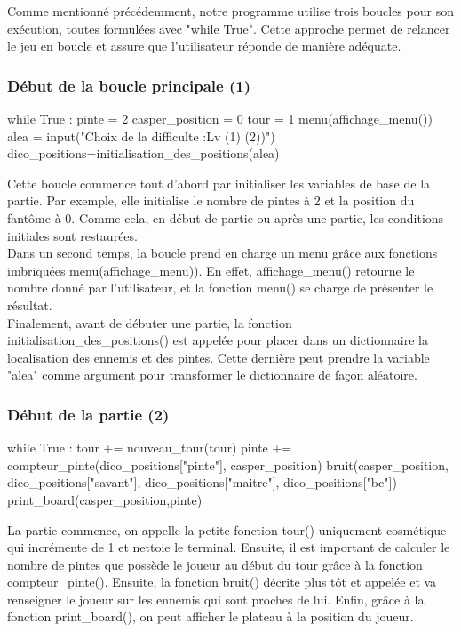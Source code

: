 \documentclass[titlepage]{report}
\begin{document}
{\hspace*{0.5cm} Comme mentionné précédemment, notre programme utilise trois boucles pour son exécution, toutes formulées avec "while True". Cette approche permet de relancer le jeu en boucle et assure que l'utilisateur réponde de manière adéquate.

\subsubsection{Début de la boucle principale (1)}
\begin{python}
while True :
    pinte = 2
    casper_position = 0    
    tour = 1 
    menu(affichage_menu()) 
    alea = input("Choix de la difficulte :Lv (1) (2))")
    dico_positions=initialisation_des_positions(alea)
\end{python}
\vspace*{0.5cm}
\hspace*{0.5cm}Cette boucle commence tout d'abord par initialiser les variables de base de la partie. Par exemple, elle initialise le nombre de pintes à 2 et la position du fantôme à 0. Comme cela, en début de partie ou après une partie, les conditions initiales sont restaurées.\\
\hspace*{0.5cm}Dans un second temps, la boucle prend en charge un menu grâce aux fonctions imbriquées menu(affichage\_menu)). En effet, affichage\_menu() retourne le nombre donné par l'utilisateur, et la fonction menu() se charge de présenter le résultat.\\
\hspace*{0.5cm}Finalement, avant de débuter une partie, la fonction initialisation\_des\_positions() est appelée pour placer dans un dictionnaire la localisation des ennemis et des pintes. Cette dernière peut prendre la variable "alea" comme argument pour transformer le dictionnaire de façon aléatoire.\\  

\subsubsection{Début de la partie (2)}
\begin{python}
    while True :
        tour += nouveau_tour(tour)
        pinte += compteur_pinte(dico_positions["pinte"], casper_position) 
        bruit(casper_position, dico_positions["savant"],
            dico_positions["maitre"], dico_positions["bc"]) 
        print_board(casper_position,pinte)
\end{python}
\vspace*{0.5cm}
\hspace*{0.5cm}La partie commence, on appelle la petite fonction tour() uniquement cosmétique qui incrémente de 1 et nettoie le terminal. Ensuite, il est important de calculer le nombre de pintes que possède le joueur au début du tour grâce à la fonction compteur\_pinte(). 
\hspace*{0.5cm}Ensuite, la fonction bruit() décrite plus tôt et appelée et va renseigner le joueur sur les ennemis qui sont proches de lui. Enfin, grâce à la fonction print\_board(), on peut afficher le plateau à la position du joueur. 

}
\end{document}
